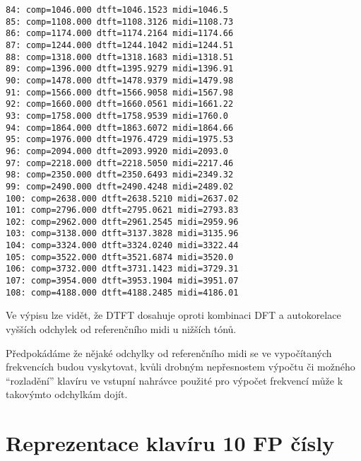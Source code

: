 \documentclass[11pt]{article}
\begin{document}
\begin{Verbatim}[commandchars=\\\{\}]
84: comp=1046.000 dtft=1046.1523 midi=1046.5
85: comp=1108.000 dtft=1108.3126 midi=1108.73
86: comp=1174.000 dtft=1174.2164 midi=1174.66
87: comp=1244.000 dtft=1244.1042 midi=1244.51
88: comp=1318.000 dtft=1318.1683 midi=1318.51
89: comp=1396.000 dtft=1395.9279 midi=1396.91
90: comp=1478.000 dtft=1478.9379 midi=1479.98
91: comp=1566.000 dtft=1566.9058 midi=1567.98
92: comp=1660.000 dtft=1660.0561 midi=1661.22
93: comp=1758.000 dtft=1758.9539 midi=1760.0
94: comp=1864.000 dtft=1863.6072 midi=1864.66
95: comp=1976.000 dtft=1976.4729 midi=1975.53
96: comp=2094.000 dtft=2093.9920 midi=2093.0
97: comp=2218.000 dtft=2218.5050 midi=2217.46
98: comp=2350.000 dtft=2350.6493 midi=2349.32
99: comp=2490.000 dtft=2490.4248 midi=2489.02
100: comp=2638.000 dtft=2638.5210 midi=2637.02
101: comp=2796.000 dtft=2795.0621 midi=2793.83
102: comp=2962.000 dtft=2961.2545 midi=2959.96
103: comp=3138.000 dtft=3137.3828 midi=3135.96
104: comp=3324.000 dtft=3324.0240 midi=3322.44
105: comp=3522.000 dtft=3521.6874 midi=3520.0
106: comp=3732.000 dtft=3731.1423 midi=3729.31
107: comp=3954.000 dtft=3953.1904 midi=3951.07
108: comp=4188.000 dtft=4188.2485 midi=4186.01
    \end{Verbatim}

    Ve výpisu lze vidět, že DTFT dosahuje oproti kombinaci DFT a
autokorelace vyšších odchylek od referenčního midi u nižších tónů.

    Předpokádáme že nějaké odchylky od referenčního midi se ve vypočítaných
frekvencích budou vyskytovat, kvůli drobným nepřesnostem výpočtu či
možného ``rozladění'' klavíru ve vstupní nahrávce použité pro výpočet
frekvencí může k takovýmto odchylkám dojít.

    \hypertarget{reprezentace-klavuxedru-10-fp-ux10duxedsly}{%
\section{Reprezentace klavíru 10 FP
čísly}\label{reprezentace-klavuxedru-10-fp-ux10duxedsly}}
\end{document}
